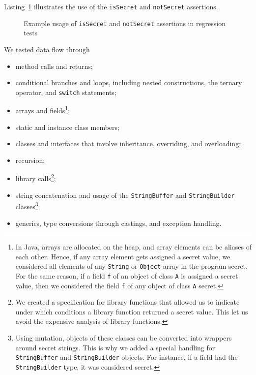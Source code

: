 \begin{example}
  Listing~\ref{list:assertions} illustrates the use of the \verb'isSecret' and \verb'notSecret' assertions.
\begin{figure}
  \centering
  \begin{minipage}{\textwidth}
  \end{minipage}
  \caption{Example usage of \texttt{isSecret} and \texttt{notSecret} assertions in regression tests}
  \label{list:assertions}
\end{figure}
\end{example}

We tested data flow through
\begin{itemize}
  \item method calls and returns;
  \item conditional branches and loops, including nested constructions, the ternary operator, and \verb'switch' statements;
  \item arrays and fields\footnote{%
    In Java, arrays are allocated on the heap, and array elements can be aliases of each other. 
    Hence, if any array element gets assigned a secret value, we considered all elements of any \texttt{String} or \texttt{Object} array in the program secret. 
    For the same reason, if a field \texttt{f} of an object of class \texttt{A} is assigned a secret value, then we considered the field \texttt{f} of any object of class \texttt{A} secret.%
  };
  \item static and instance class members;
  \item classes and interfaces that involve inheritance, overriding, and overloading;
  \item recursion;
  \item library calls\footnote{%
    We created a specification for library functions that allowed us to indicate under which conditions a library function returned a secret value. This let us avoid the expensive analysis of library functions.%
  };
  \item string concatenation and usage of the \texttt{StringBuffer} and \texttt{StringBuilder} classes\footnote{%
    Using mutation, objects of these classes can be converted into wrappers around secret strings. This is why we added a special handling for \texttt{StringBuffer} and \texttt{StringBuilder} objects. For instance, if a field had the  \texttt{StringBuilder} type, it was considered secret.%
  };
  \item generics, type conversions through castings, and exception handling.
\end{itemize}

